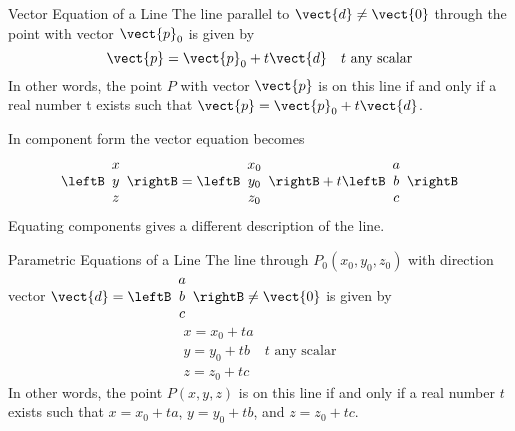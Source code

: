 \begin{theorem*}[label=thm:011278]{Vector Equation of a Line}
The line parallel to $\vect{d} \neq \vect{0}$ through the point with vector $\vect{p}_{0}$ is given by
\begin{equation*}
\vect{p} = \vect{p}_{0} + t\vect{d} \quad  t \mbox{ any scalar}
\end{equation*}
In other words, the point $P$ with vector $\vect{p}$ is on this line if and only if a real number t exists such that $\vect{p} = \vect{p}_{0} + t\vect{d}$.
\end{theorem*}

\noindent In component form the vector equation becomes
\begin{equation*}
\leftB
\begin{array}{c}
x \\
y \\
z  
\end{array}
\rightB
=
\leftB
\begin{array}{c}
x_{0} \\
y_{0} \\
z_{0}  
\end{array}
\rightB
+
t
\leftB
\begin{array}{c}
a \\
b \\
c  
\end{array}
\rightB
\end{equation*}
Equating components gives a different description of the line.


\begin{theorem*}[label=thm:011288]{Parametric Equations of a Line}
The line through $P_{0}(x_{0}, y_{0}, z_{0})$ with direction vector 
$\vect{d} = \leftB
\begin{array}{c}
a \\
b \\
c  
\end{array}
\rightB
\neq \vect{0}$ is given by
\begin{equation*}
\begin{array}{ll}
x = x_{0} + ta &\\
y = y_{0} + tb & t \mbox{ any scalar}\\
z = z_{0} + tc &
\end{array}
\end{equation*}
In other words, the point $P(x, y, z)$ is on this line if and only if a real number $t$ exists such that $x = x_{0} + ta$, $y = y_{0} + tb$, and $z = z_{0} + tc$.
\end{theorem*}

